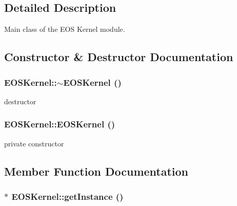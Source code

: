 \subsection{Detailed Description}
Main class of the EOS Kernel module. 

\subsection{Constructor \& Destructor Documentation}
\hypertarget{structEOSKernel_4d41f3d1f8081b9e9e729708ae66996b}{
\subsubsection[{$\sim$EOSKernel}]{\setlength{\rightskip}{0pt plus 5cm}EOSKernel::$\sim$EOSKernel ()}}
\label{structEOSKernel_4d41f3d1f8081b9e9e729708ae66996b}


destructor 

\hypertarget{structEOSKernel_06b0f1294a41e6203f303991ccfd9f56}{
\subsubsection[{EOSKernel}]{\setlength{\rightskip}{0pt plus 5cm}EOSKernel::EOSKernel ()}}
\label{structEOSKernel_06b0f1294a41e6203f303991ccfd9f56}


private constructor 



\subsection{Member Function Documentation}
\hypertarget{structEOSKernel_b18f0db248717d197b3f0963265bf541}{
\subsubsection[{getInstance}]{ $\ast$ EOSKernel::getInstance ()}}
\label{structEOSKernel_b18f0db248717d197b3f0963265bf541}


